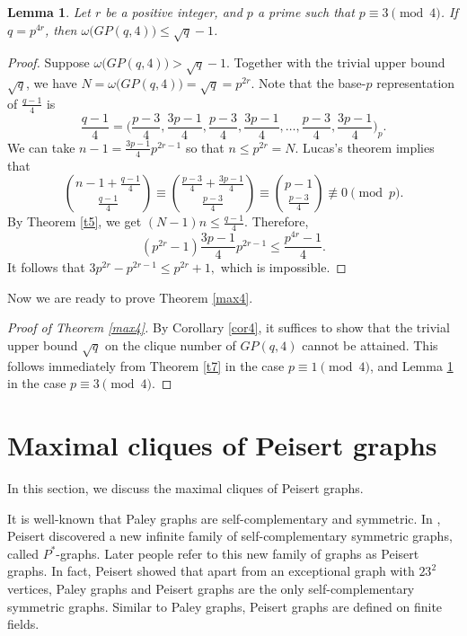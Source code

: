 \documentclass[12pt,oneside]{amsart}
\newtheorem{lem}[thm]{Lemma}
\begin{document}
\begin{lem}\label{cor44}
Let $r$ be a positive integer, and $p$ a prime such that $p \equiv 3 \pmod 4$. If $q=p^{4r}$, then $\omega\big(GP(q,4)\big)\leq \sqrt{q}-1$.
\end{lem}

\begin{proof}
Suppose $\omega\big(GP(q,4)\big)>\sqrt{q}-1$. Together with the trivial upper bound $\sqrt{q}$, we have $N=\omega\big(GP(q,4)\big)=\sqrt{q}=p^{2r}$. Note that the base-$p$ representation of $\frac{q-1}{4}$ is $$\frac{q-1}{4}=\bigg(\frac{p-3}{4},\frac{3p-1}{4},\frac{p-3}{4},\frac{3p-1}{4}, \ldots, \frac{p-3}{4},\frac{3p-1}{4}\bigg)_p.$$
We can take $n-1=\frac{3p-1}{4}p^{2r-1}$ so that $n \leq p^{2r}=N$. Lucas's theorem implies that $$\binom{n-1+\frac{q-1}{4}}{\frac{q-1}{4}} \equiv \binom{\frac{p-3}{4}+\frac{3p-1}{4}}{\frac{p-3}{4}} \equiv \binom{p-1}{{\frac{p-3}{4}}}\not \equiv 0 \pmod p.
$$
By Theorem \ref{t5}, we get $(N-1)n \leq \frac{q-1}{4}$. Therefore, $$(p^{2r}-1)\frac{3p-1}{4}p^{2r-1} \leq \frac{p^{4r}-1}{4}.$$
It follows that
$
3p^{2r}-p^{2r-1} \leq p^{2r}+1,
$
which is impossible. 
\end{proof}

Now we are ready to prove Theorem \ref{max4}.
\begin{proof}[Proof of Theorem \ref{max4}]
By Corollary \ref{cor4}, it suffices to show that the trivial upper bound $\sqrt{q}$ on the clique number of $GP(q,4)$ cannot be attained. This follows immediately from Theorem \ref{t7} in the case $p \equiv 1 \pmod 4$, and Lemma \ref{cor44} in the case $p \equiv 3 \pmod 4$.
\end{proof}

\section{Maximal cliques of Peisert graphs}
In this section, we discuss the maximal cliques of Peisert graphs.

It is well-known that Paley graphs are self-complementary and symmetric. In \cite{WP2}, Peisert discovered a new infinite family of self-complementary symmetric graphs, called $P^*$-graphs. Later people refer to this new family of graphs as Peisert graphs. In fact, Peisert \cite{WP2} showed that apart from an exceptional graph with $23^2$ vertices, Paley graphs and Peisert graphs are the only self-complementary symmetric graphs. Similar to Paley graphs, Peisert graphs are defined on finite fields. 
\end{document}
